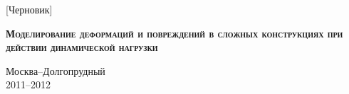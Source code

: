 \begin{titlepage}
\newpage

\begin{center}
\end{center}

\vspace{2em}

\begin{center}
[Черновик]
\end{center}

\vspace{5em}

\begin{center}
\textsc{\textbf{Моделирование деформаций и повреждений в сложных конструкциях при действии динамической нагрузки}}
\end{center}

\vspace{\fill}
\begin{center}
Москва--Долгопрудный\\
2011--2012
\end{center}

\end{titlepage}
